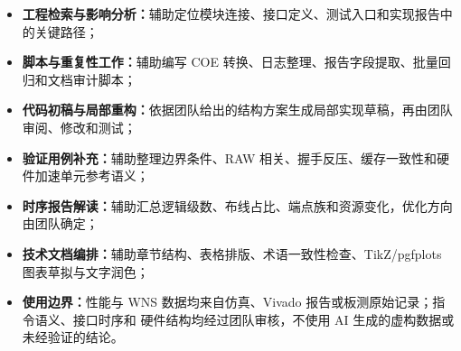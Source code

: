 \begin{itemize}
  \item \textbf{工程检索与影响分析：}辅助定位模块连接、接口定义、测试入口和实现报告中的关键路径；
  \item \textbf{脚本与重复性工作：}辅助编写 COE 转换、日志整理、报告字段提取、批量回归和文档审计脚本；
  \item \textbf{代码初稿与局部重构：}依据团队给出的结构方案生成局部实现草稿，再由团队审阅、修改和测试；
  \item \textbf{验证用例补充：}辅助整理边界条件、RAW 相关、握手反压、缓存一致性和硬件加速单元参考语义；
  \item \textbf{时序报告解读：}辅助汇总逻辑级数、布线占比、端点族和资源变化，优化方向由团队确定；
  \item \textbf{技术文档编排：}辅助章节结构、表格排版、术语一致性检查、TikZ/pgfplots 图表草拟与文字润色；
  \item \textbf{使用边界：}性能与 WNS 数据均来自仿真、Vivado 报告或板测原始记录；指令语义、接口时序和
  硬件结构均经过团队审核，不使用 AI 生成的虚构数据或未经验证的结论。
\end{itemize}
